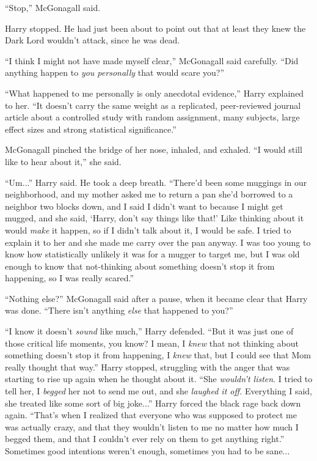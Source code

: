 “Stop,” McGonagall said.

Harry stopped. He had just been about to point out that at least they knew the Dark Lord wouldn’t attack, since he was dead.

“I think I might not have made myself clear,” McGonagall said carefully. “Did anything happen to \emph{you personally} that would scare you?”

\sloppypar “What happened to me personally is only anecdotal evidence,” Harry explained to her. “It doesn’t carry the same weight as a replicated, peer-reviewed journal article about a controlled study with random assignment, many subjects, large effect sizes and strong statistical significance.”

McGonagall pinched the bridge of her nose, inhaled, and exhaled. “I would still like to hear about it,” she said.

“Um...” Harry said. He took a deep breath. “There’d been some muggings in our neighborhood, and my mother asked me to return a pan she’d borrowed to a neighbor two blocks down, and I said I didn’t want to because I might get mugged, and she said, ‘Harry, don’t say things like that!’ Like thinking about it would \emph{make} it happen, so if I didn’t talk about it, I would be safe. I tried to explain it to her and she made me carry over the pan anyway. I was too young to know how statistically unlikely it was for a mugger to target me, but I was old enough to know that not-thinking about something doesn’t stop it from happening, so I was really scared.”

“Nothing else?” McGonagall said after a pause, when it became clear that Harry was done. “There isn’t anything \emph{else} that happened to you?”

“I know it doesn’t \emph{sound} like much,” Harry defended. “But it was just one of those critical life moments, you know? I mean, I \emph{knew} that not thinking about something doesn’t stop it from happening, I \emph{knew} that, but I could see that Mom really thought that way.” Harry stopped, struggling with the anger that was starting to rise up again when he thought about it. “She \emph{wouldn’t listen}. I tried to tell her, I \emph{begged} her not to send me out, and she \emph{laughed it off.} Everything I said, she treated like some sort of big joke...” Harry forced the black rage back down again. “That’s when I realized that everyone who was supposed to protect me was actually crazy, and that they wouldn’t listen to me no matter how much I begged them, and that I couldn’t ever rely on them to get anything right.” Sometimes good intentions weren’t enough, sometimes you had to be sane...


